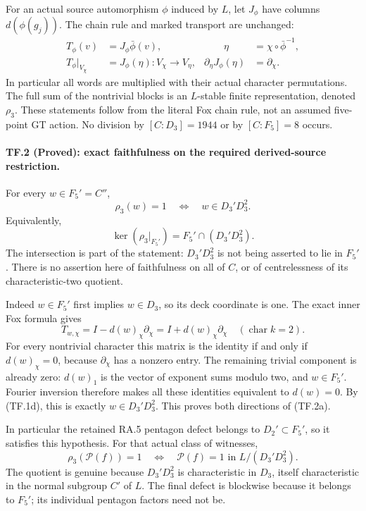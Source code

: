 For an actual source automorphism $\phi$ induced by $L$,
let $J_\phi$ have columns $d(\phi(g_j))$. The chain rule
and marked transport are unchanged:
\[
 \begin{aligned}
 T_\phi(v)&=J_\phi\bar\phi(v),
 &\qquad \eta&=\chi\circ\bar\phi^{-1},\\
 T_\phi|_{V_\chi}&=J_\phi(\eta):V_\chi\longrightarrow V_\eta,
 &\partial_\eta J_\phi(\eta)&=\partial_\chi.
 \end{aligned}
 \tag{TF.1f}
\]
In particular all words are multiplied with their actual
character permutations. The full sum of the nontrivial
blocks is an $L$-stable finite representation, denoted
$\rho_3$. These statements follow from the literal Fox
chain rule, not an assumed five-point GT action.
No division by $[C:D_3]=1944$ or by $[C:F_5]=8$ occurs.

\paragraph{TF.2 (Proved): exact faithfulness on the required derived-source restriction.}
For every $w\in F_5'=C''$,
\[
 \boxed{\quad
 \rho_3(w)=1\quad\Longleftrightarrow\quad
                  w\in D_3'D_3^2.\quad}
 \tag{TF.2a}
\]
Equivalently,
\[
       \ker(\rho_3|_{F_5'})=F_5'\cap(D_3'D_3^2).
 \tag{TF.2b}
\]
The intersection is part of the statement: $D_3'D_3^2$
is not being asserted to lie in $F_5'$.
There is no assertion here of faithfulness on all of $C$,
or of centrelessness of its characteristic-two quotient.

Indeed $w\in F_5'$ first implies $w\in D_3$, so its deck
coordinate is one. The exact inner Fox formula gives
\[
       T_{w,\chi}=I-d(w)_\chi\partial_\chi
                =I+d(w)_\chi\partial_\chi
                         \quad(\operatorname{char}k=2).
 \tag{TF.2c}
\]
For every nontrivial character this matrix is the identity
if and only if $d(w)_\chi=0$, because $\partial_\chi$
has a nonzero entry. The remaining trivial component is
already zero: $d(w)_1$ is the vector of exponent sums
modulo two, and $w\in F_5'$. Fourier inversion therefore
makes all these identities equivalent to $d(w)=0$.
By (TF.1d), this is exactly $w\in D_3'D_3^2$.
This proves both directions of (TF.2a).

In particular the retained RA.5 pentagon defect belongs
to $D_2'\subset F_5'$, so it satisfies this hypothesis.
For that actual class of witnesses,
\[
 \boxed{\quad
 \rho_3(\mathcal P(f))=1
 \quad\Longleftrightarrow\quad
 \mathcal P(f)=1\text{ in }L/(D_3'D_3^2).\quad}
 \tag{TF.2d}
\]
The quotient is genuine because $D_3'D_3^2$ is
characteristic in $D_3$, itself characteristic in the
normal subgroup $C'$ of $L$.
The final defect is blockwise because it belongs to
$F_5'$; its individual pentagon factors need not be.

